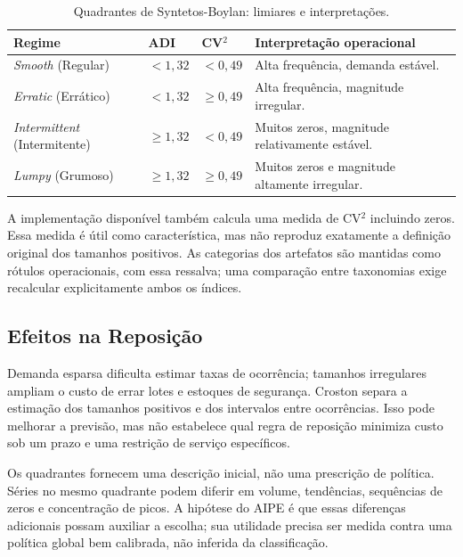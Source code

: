 \begin{table}[htbp]
\centering
\small
\renewcommand{\arraystretch}{1.2}
\caption{Quadrantes de Syntetos-Boylan: limiares e interpretações.}
\label{tab:sb_quad}
\begin{tabular}{llll}
\toprule
Regime & ADI & CV$^2$ & Interpretação operacional \\
\midrule
\textit{Smooth} (Regular) & $< 1{,}32$ & $< 0{,}49$ & Alta frequência, demanda estável. \\
\textit{Erratic} (Errático) & $< 1{,}32$ & $\geq 0{,}49$ & Alta frequência, magnitude irregular. \\
\textit{Intermittent} (Intermitente) & $\geq 1{,}32$ & $< 0{,}49$ & Muitos zeros, magnitude relativamente estável. \\
\textit{Lumpy} (Grumoso) & $\geq 1{,}32$ & $\geq 0{,}49$ & Muitos zeros e magnitude altamente irregular. \\
\bottomrule
\end{tabular}
\end{table}

A implementação disponível também calcula uma medida de CV$^2$ incluindo zeros. Essa medida é útil como característica, mas não reproduz exatamente a definição original dos tamanhos positivos. As categorias dos artefatos são mantidas como rótulos operacionais, com essa ressalva; uma comparação entre taxonomias exige recalcular explicitamente ambos os índices.

\subsection{Efeitos na Reposição}

Demanda esparsa dificulta estimar taxas de ocorrência; tamanhos irregulares ampliam o custo de errar lotes e estoques de segurança. Croston separa a estimação dos tamanhos positivos e dos intervalos entre ocorrências. Isso pode melhorar a previsão, mas não estabelece qual regra de reposição minimiza custo sob um prazo e uma restrição de serviço específicos.



Os quadrantes fornecem uma descrição inicial, não uma prescrição de política. Séries no mesmo quadrante podem diferir em volume, tendências, sequências de zeros e concentração de picos. A hipótese do AIPE é que essas diferenças adicionais possam auxiliar a escolha; sua utilidade precisa ser medida contra uma política global bem calibrada, não inferida da classificação.

